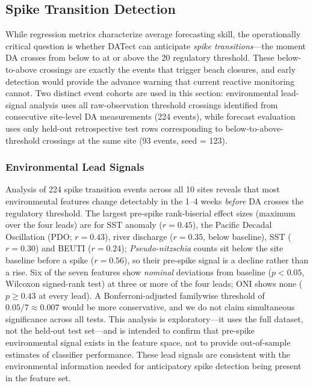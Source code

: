 \documentclass[toxins,article,submit,moreauthors]{Definitions/mdpi}
\begin{document}
\subsection{Spike Transition Detection}
\label{sec:results-spike}

While regression metrics characterize average forecasting skill, the operationally critical question is whether DATect can anticipate \emph{spike transitions}---the moment DA crosses from below to at or above the \SI{20}{\microgrampeg} regulatory threshold. These below-to-above crossings are exactly the events that trigger beach closures, and early detection would provide the advance warning that current reactive monitoring cannot. Two distinct event cohorts are used in this section: environmental lead-signal analysis uses all raw-observation threshold crossings identified from consecutive site-level DA measurements (224 events), while forecast evaluation uses only held-out retrospective test rows corresponding to below-to-above-threshold crossings at the same site (93 events, seed = 123).

\subsubsection{Environmental Lead Signals}
\label{sec:results-env-lead}

Analysis of 224 spike transition events across all 10 sites reveals that most environmental features change detectably in the 1--4 weeks \emph{before} DA crosses the regulatory threshold. The largest pre-spike rank-biserial effect sizes (maximum over the four leads) are for SST anomaly ($r = 0.45$), the Pacific Decadal Oscillation (PDO; $r = 0.43$), river discharge ($r = 0.35$, below baseline), SST ($r = 0.30$) and BEUTI ($r = 0.24$); \textit{Pseudo-nitzschia} counts sit below the site baseline before a spike ($r = 0.56$), so their pre-spike signal is a decline rather than a rise. Six of the seven features show \emph{nominal} deviations from baseline ($p < 0.05$, Wilcoxon signed-rank test) at three or more of the four leads; ONI shows none ($p \geq 0.43$ at every lead). A Bonferroni-adjusted familywise threshold of $0.05/7 \approx 0.007$ would be more conservative, and we do not claim simultaneous significance across all tests. This analysis is exploratory---it uses the full dataset, not the held-out test set---and is intended to confirm that pre-spike environmental signal exists in the feature space, not to provide out-of-sample estimates of classifier performance. These lead signals are consistent with the environmental information needed for anticipatory spike detection being present in the feature set.
\end{document}

